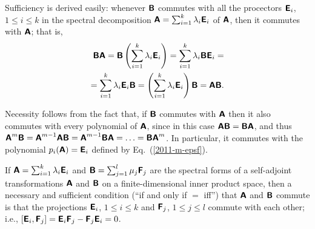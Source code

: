 {\color{OliveGreen}\bproof
Sufficiency is derived easily: whenever   $\textsf{\textbf{B}}$
commutes with all the procectors $\textsf{\textbf{E}}_i$, $1\le i\le k$
in the spectral decomposition
$\textsf{\textbf{A}}
=
\sum_{i=1}^k \lambda_i \textsf{\textbf{E}}_i
$
of   $\textsf{\textbf{A}}$,
then it commutes with $\textsf{\textbf{A}}$; that is,
\begin{equation}
\begin{split}
 \textsf{\textbf{B}}\textsf{\textbf{A}}
=
\textsf{\textbf{B}}\left(\sum_{i=1}^k \lambda_i \textsf{\textbf{E}}_i\right)
=
\sum_{i=1}^k \lambda_i \textsf{\textbf{B}}\textsf{\textbf{E}}_i
=
\\
=
\sum_{i=1}^k \lambda_i \textsf{\textbf{E}}_i  \textsf{\textbf{B}}
=
\left(\sum_{i=1}^k \lambda_i \textsf{\textbf{E}}_i \right)  \textsf{\textbf{B}}
=\textsf{\textbf{A}} \textsf{\textbf{B}}
.
\end{split}
\end{equation}

Necessity follows from the fact that, if  $\textsf{\textbf{B}}$
commutes with  $\textsf{\textbf{A}}$
then it also commutes with every polynomial of  $\textsf{\textbf{A}}$,
since in this case $\textsf{\textbf{A}}\textsf{\textbf{B}} = \textsf{\textbf{B}} \textsf{\textbf{A}}$, and thus
$
\textsf{\textbf{A}}^m \textsf{\textbf{B}}
=
\textsf{\textbf{A}}^{m-1} \textsf{\textbf{A}} \textsf{\textbf{B}}
=
\textsf{\textbf{A}}^{m-1}  \textsf{\textbf{B}} \textsf{\textbf{A}} =
\ldots = \textsf{\textbf{B}} \textsf{\textbf{A}}^m$.
In particular, it commutes with the polynomial $p_i(\textsf{\textbf{A}})=\textsf{\textbf{E}}_i$
defined by Eq.~(\ref{2011-m-epsf}).
\eproof
}

If $\textsf{\textbf{A}}=\sum_{i=1}^k \lambda_i\textsf{\textbf{E}}_i$
and
$\textsf{\textbf{B}}=\sum_{j=1}^l \mu_j\textsf{\textbf{F}}_j$
are the spectral forms of a self-adjoint transformations
$\textsf{\textbf{A}}$ and $\textsf{\textbf{B}}$
on a finite-dimensional inner product space,
then a necessary and sufficient condition (``if and only if $=$ iff'')
that  $\textsf{\textbf{A}}$ and
 $\textsf{\textbf{B}}$ commute
is that the projections
$\textsf{\textbf{E}}_i$, $1\le i\le k$
and
$\textsf{\textbf{F}}_j$, $1\le j\le l$
commute with each other; i.e.,
$\left[\textsf{\textbf{E}}_i,\textsf{\textbf{F}}_j\right] =
\textsf{\textbf{E}}_i \textsf{\textbf{F}}_j-
\textsf{\textbf{F}}_j\textsf{\textbf{E}}_i =0 $.

